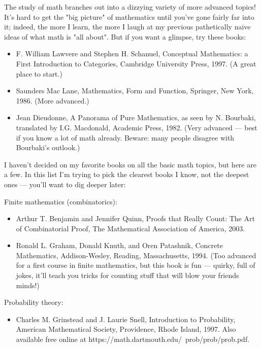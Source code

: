 \documentclass[10pt,a4paper]{book}
\theoremstyle{definition}
\begin{document}
The study of math branches out into a dizzying variety of more advanced topics! It's hard to get the "big picture" of mathematics until you've gone fairly far into it; indeed, the more I learn, the more I laugh at my previous pathetically naive ideas of what math is "all about". But if you want a glimpse, try these books:

\begin{itemize}
\item F. William Lawvere and Stephen H. Schanuel, Conceptual Mathematics: a First Introduction to Categories, Cambridge University Press, 1997. (A great place to start.)

\item Saunders Mac Lane, Mathematics, Form and Function, Springer, New York, 1986. (More advanced.)

\item Jean Dieudonne, A Panorama of Pure Mathematics, as seen by N. Bourbaki, translated by I.G. Macdonald, Academic Press, 1982. (Very advanced — best if you know a lot of math already. Beware: many people disagree with Bourbaki's outlook.)
\end{itemize}

I haven't decided on my favorite books on all the basic math topics, but here are a few. In this list I'm trying to pick the clearest books I know, not the deepest ones — you'll want to dig deeper later:

Finite mathematics (combinatorics):

\begin{itemize}
\item Arthur T. Benjamin and Jennifer Quinn, Proofs that Really Count: The Art of Combinatorial Proof, The Mathematical Association of America, 2003.

\item Ronald L. Graham, Donald Knuth, and Oren Patashnik, Concrete Mathematics, Addison-Wesley, Reading, Massachusetts, 1994. (Too advanced for a first course in finite mathematics, but this book is fun — quirky, full of jokes, it'll teach you tricks for counting stuff that will blow your friends minds!)
\end{itemize}

Probability theory:

\begin{itemize}
\item Charles M. Grinstead and J. Laurie Snell, Introduction to Probability, American Mathematical Society, Providence, Rhode Island, 1997. Also available free online at https://math.dartmouth.edu/~prob/prob/prob.pdf.
\end{itemize}
\end{document}
